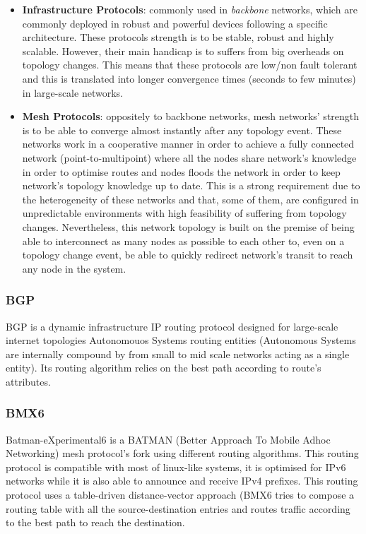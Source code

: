 \begin{itemize}
    \item \textbf{Infrastructure Protocols}: commonly used in \textit{backbone} networks, which are commonly deployed in robust and powerful devices following a specific architecture. These protocols strength is to be stable, robust and highly scalable. However, their main handicap is to suffers from big overheads on topology changes. This means that these protocols are low/non fault tolerant and this is translated into longer convergence times (seconds to few minutes) in large-scale networks.

    \item \textbf{Mesh Protocols}: oppositely to backbone networks, mesh networks' strength is to be able to converge almost instantly after any topology event. These networks work in a cooperative manner in order to achieve a fully connected network (point-to-multipoint) where all the nodes share network's knowledge in order to optimise routes and nodes floods the network in order to keep network's topology knowledge up to date. This is a strong requirement due to the heterogeneity of these networks and that, some of them, are configured in unpredictable environments with high feasibility of suffering from topology changes. Nevertheless, this network topology is built on the premise of being able to interconnect as many nodes as possible to each other to, even on a topology change event, be able to quickly redirect network's transit to reach any node in the system.
\end{itemize}

\subsubsection{BGP}
\label{subsubsec:bgp}
BGP is a dynamic infrastructure IP routing protocol designed for large-scale internet topologies Autonomouos Systems routing entities (Autonomous Systems are internally compound by from small to mid scale networks acting as a single entity). Its routing algorithm relies on the best path according to route's attributes.

\subsubsection{BMX6}
\label{subsec:bmx6}
Batman-eXperimental6 \cite{bmx6} is a BATMAN (Better Approach To Mobile Adhoc Networking) mesh protocol's fork using different routing algorithms. This routing protocol is compatible with most of linux-like systems, it is optimised for IPv6 networks while it is also able to announce and receive IPv4 prefixes. This routing protocol uses a table-driven distance-vector approach (BMX6 tries to compose a routing table with all the source-destination entries and routes traffic according to the best path to reach the destination.

